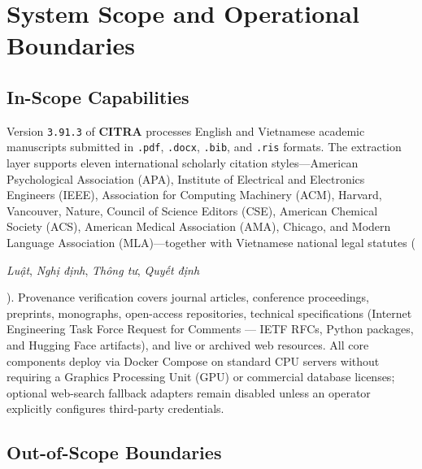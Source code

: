 \section{System Scope and Operational Boundaries}

\subsection{In-Scope Capabilities}

Version \texttt{3.91.3} of \textbf{CITRA} processes English and Vietnamese academic manuscripts submitted in \texttt{.pdf}, \texttt{.docx}, \texttt{.bib}, and \texttt{.ris} formats. The extraction layer supports eleven international scholarly citation styles---American Psychological Association (APA), Institute of Electrical and Electronics Engineers (IEEE), Association for Computing Machinery (ACM), Harvard, Vancouver, Nature, Council of Science Editors (CSE), American Chemical Society (ACS), American Medical Association (AMA), Chicago, and Modern Language Association (MLA)---together with Vietnamese national legal statutes (\begin{vietnamese}\textit{Luật}, \textit{Nghị định}, \textit{Thông tư}, \textit{Quyết định}\end{vietnamese}). Provenance verification covers journal articles, conference proceedings, preprints, monographs, open-access repositories, technical specifications (Internet Engineering Task Force Request for Comments --- IETF RFCs, Python packages, and Hugging Face artifacts), and live or archived web resources. All core components deploy via Docker Compose on standard CPU servers without requiring a Graphics Processing Unit (GPU) or commercial database licenses; optional web-search fallback adapters remain disabled unless an operator explicitly configures third-party credentials.

\subsection{Out-of-Scope Boundaries}

